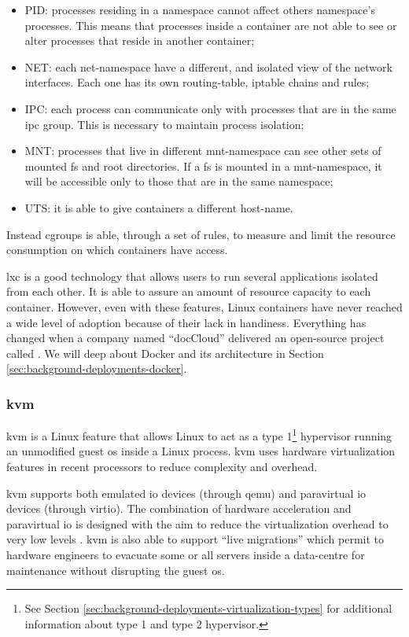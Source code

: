 \begin{itemize}
	\item{PID: processes residing in a namespace cannot affect others namespace's processes. This
		means that processes inside a container are not able to see or alter processes that reside in
		another container;}
	\item{NET: each net-namespace have a different, and isolated view of the network interfaces. Each
		one has its own routing-table, iptable chains and rules;}
	\item{IPC: each process can communicate only with processes that are in the same \ac{ipc} group. This
		is necessary to maintain process isolation;}
	\item{MNT: processes that live in different mnt-namespace can see other sets of mounted \ac{fs} and
		root directories. If a \ac{fs} is mounted in a mnt-namespace, it will be accessible only to those
		that are in the same namespace;}
	\item{UTS: it is able to give containers a different host-name.}
\end{itemize}

Instead cgroups is able, through a set of rules, to measure and limit the resource consumption on which
containers have access.

\ac{lxc} is a good technology that allows users to run several applications isolated from each other. It
is able to assure an amount of resource capacity to each container. However, even with these features,
Linux containers have never reached a wide level of adoption because of their lack in handiness. Everything
has changed when a company named ``docCloud'' delivered an open-source project called .
We will deep about Docker and its architecture in Section \ref{sec:background-deployments-docker}.

\subsubsection{\acf{kvm}}
\label{sec:background-deployments-virtualization-kvm}
\ac{kvm} is a Linux feature that allows Linux to act as a type 1\footnote{See Section
\ref{sec:background-deployments-virtualization-types} for additional information about type 1 and type 2
hypervisor.} hypervisor running an unmodified guest \acs{os} inside a Linux process. \ac{kvm} uses hardware
virtualization features in recent processors to reduce complexity and overhead.

\ac{kvm} supports both emulated \acs{io} devices (through \ac{qemu}) and paravirtual \acs{io} devices
(through virtio). The combination of hardware acceleration and paravirtual \acs{io} is designed with
the aim to reduce the virtualization overhead to very low levels \cite{mcdougall2010virtualization}.
\ac{kvm} is also able to support ``live migrations'' which permit to hardware engineers to evacuate
some or all servers inside a data-centre for maintenance without disrupting the guest \acs{os}.


